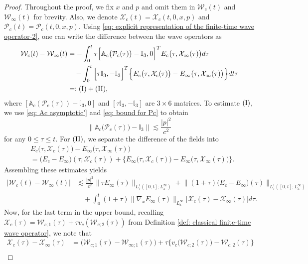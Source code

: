 \documentclass[reqno, 11pt, letterpaper]{amsart}
\theoremstyle{remark}
\numberwithin{equation}{section}
\numberwithin{theorem}{section}
\numberwithin{table}{section}
\numberwithin{figure}{section}
\begin{document}
\begin{proof}
Throughout the proof, we fix $x$ and $p$ and omit them in $\mathcal{W}_c(t)$ and $\mathcal{W}_\infty(t)$ for brevity. Also, we denote $\mathcal{X}_c(t)=\mathcal{X}_c(t,0,x,p)$ and $\mathcal{P}_c(t)=\mathcal{P}_c(t,0,x,p)$. Using \eqref{eq: explicit representation of the finite-time wave operator-2}, one can write the difference between the wave operators as
$$\begin{aligned}
\mathcal{W}_c(t)-\mathcal{W}_\infty(t)
&=-\int_0^t\tau\Big[\mathbb{A}_c\big(\mathcal{P}_c(\tau)\big)-\mathbb{I}_3, 0\Big]^T E_c\big(\tau,\mathcal{X}_\infty(\tau)\big)d\tau\\
&\quad-\int_0^t \Big[\tau\mathbb{I}_3, -\mathbb{I}_3\Big]^T\Big\{E_c\big(\tau,\mathcal{X}_c(\tau)\big)-E_\infty\big(\tau,\mathcal{X}_\infty(\tau)\big)\Big\}dt\tau\\
&=:\textup{(I)}+\textup{(II)},
\end{aligned}$$
where $[\mathbb{A}_c(\mathcal{P}_c(\tau))-\mathbb{I}_3, 0]$ and $[\tau\mathbb{I}_3, -\mathbb{I}_3]$ are $3\times 6$ matrices. To estimate $\textup{(I)}$, we use \eqref{eq: Ac asymptotic'} and \eqref{eq: bound for Pc} to obtain 
$$\big\|\mathbb{A}_c\big(\mathcal{P}_c(\tau)\big)-\mathbb{I}_3\big\|\lesssim\frac{|p|^2}{c^2}$$
for any $0 \leq \tau \leq t$. For $\textup{(II)}$, we separate the difference of the fields into
$$\begin{aligned}
&E_c\big(\tau,\mathcal{X}_c(\tau)\big)-E_\infty\big(\tau,\mathcal{X}_\infty(\tau)\big)\\
&=\big(E_c-E_\infty\big)(\tau,\mathcal{X}_c(\tau))+\Big\{E_\infty\big(\tau,\mathcal{X}_c(\tau)\big)-E_\infty\big(\tau,\mathcal{X}_\infty(\tau)\big)\Big\}.
\end{aligned}$$
Assembling these estimates yields
$$\begin{aligned}
\big|\mathcal{W}_{c}(t)-\mathcal{W}_{\infty}(t)\big|&\lesssim \frac{|p|^2}{c^2}\|\tau E_\infty(\tau)\|_{L_{\tau}^1([0,t]; L_x^\infty)}+\big\|(1+\tau)\big(E_c-E_\infty\big)(\tau)\big\|_{L_{\tau}^1([0,t]; L_x^\infty)}\\
&\quad+\int_0^t(1+\tau)\|\nabla_x E_\infty(\tau)\|_{L_x^\infty}|\mathcal{X}_c(\tau)-\mathcal{X}_\infty(\tau)|d\tau.
\end{aligned}$$
Now, for the last term in the upper bound, recalling $\mathcal{X}_c(\tau)=\mathcal{W}_{c;1}(\tau)+\tau v_c(\mathcal{W}_{c;2}(\tau))$ from Definition \ref{def: classical finite-time wave operator}, we note that 
$$\begin{aligned}
\mathcal{X}_c(\tau)-\mathcal{X}_\infty(\tau)&=\big(\mathcal{W}_{c;1}(\tau)-\mathcal{W}_{\infty;1}(\tau)\big)+\tau \Big\{v_c\big(\mathcal{W}_{c;2}(\tau)\big)-\mathcal{W}_{c;2}(\tau)\Big\}\\

\end{aligned}$$
\end{proof}
\end{document}

